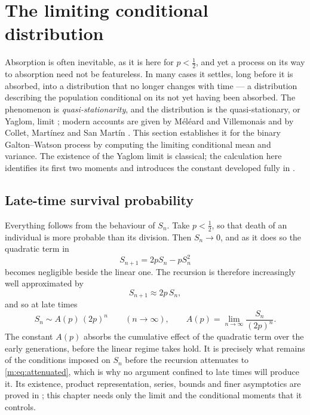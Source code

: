 \section{The limiting conditional distribution}
\label{m:sec:qsd}

Absorption is often inevitable, as it is here for $p<\tfrac12$, and yet a process
on its way to absorption need not be featureless. In many cases it settles, long
before it is absorbed, into a distribution that no longer changes with time --- a
distribution describing the population conditional on its not yet having been
absorbed. The phenomenon is \emph{quasi-stationarity}, and the distribution is the
quasi-stationary, or Yaglom, limit \cite{Yaglom1947}; modern accounts are given by
Méléard and Villemonais \cite{Meleard2012} and by Collet, Martínez and San Martín
\cite{Collet2013}. This section establishes it for the binary Galton--Watson
process by computing the limiting conditional mean and variance.  The existence of
the Yaglom limit is classical; the calculation here identifies its first two
moments and introduces the constant developed fully in \ChA.

\subsection{Late-time survival probability}
\label{m:sec:lateS}

Everything follows from the behaviour of $S_n$. Take $p<\tfrac12$, so that death of
an individual is more probable than its division. Then $S_n\to0$, and as it does so
the quadratic term in
\begin{equation*}
S_{n+1} = 2pS_n - pS_n^2
\end{equation*}
becomes negligible beside the linear one. The recursion is therefore increasingly
well approximated by
\begin{equation}
\label{m:eq:attenuated}
S_{n+1}\approx 2p\,S_n ,
\end{equation}
and so at late times
\begin{equation}
\label{m:eq:lateS}
S_n \sim A(p)\,(2p)^n\qquad(n\to\infty),
\qquad
A(p) = \lim_{n\to\infty}\frac{S_n}{(2p)^n} .
\end{equation}
The constant $A(p)$ absorbs the cumulative effect of the quadratic term over the
early generations, before the linear regime takes hold. It is precisely what
remains of the conditions imposed on $S_n$ before the recursion attenuates to
\cref{m:eq:attenuated}, which is why no argument confined to late times will produce
it.  Its existence, product representation, series, bounds and finer asymptotics
are proved in \ChA; this chapter needs only the limit and the conditional moments
that it controls.

